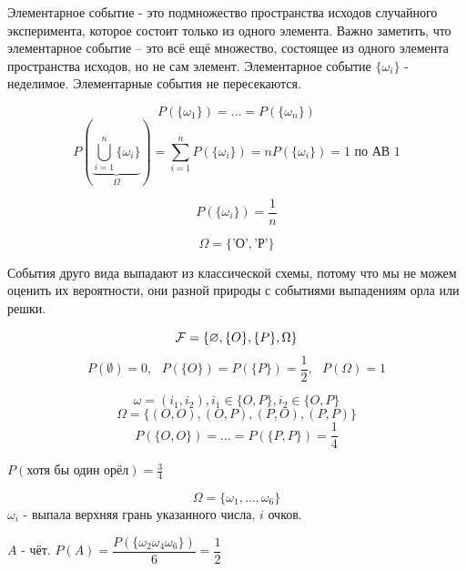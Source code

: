 \begin{definition}
	Элементарное событие - это подмножество пространства исходов случайного эксперимента, которое состоит только из одного элемента. Важно заметить, что элементарное событие – это всё ещё множество, состоящее из одного элемента пространства исходов, но не сам элемент.
	Элементарное событие $\{\omega_i\}$ - неделимое. Элементарные события не пересекаются.
\end{definition}

\begin{definition}[Равновозможность]
	\[ P(\{\omega_1\}) = \dots = P(\{\omega_n\}) \]
	\[ P(\underbrace{\bigcup_{i=1}^{n}\{\omega_i\}}_{\Omega}) = \sum_{i=1}^{n} P(\{\omega_i\}) = n P(\{\omega_i\}) = 1 \text{ по АВ 1} \]
\end{definition}

\[ P(\{\omega_i\}) = \dfrac{1}{n} \]

\begin{exmp}
	\[ \Omega = \{ \text{'О'}, \text{'Р'} \} \]
	
	События друго вида выпадают из классической схемы, потому что мы не можем оценить их вероятности, они разной природы с событиями выпадениям орла или решки.
	
	\[ {\mathcal F} = \{ \varnothing, \{O\}, \{P\}, \Omega \} \]
	\[ P(\emptyset) = 0, ~~~ P(\{O\}) = P(\{P\}) = \frac{1}{2}, ~~~ P(\Omega) = 1 \]
\end{exmp}

\begin{exmp}
	\[ \omega = (i_1, i_2), i_1 \in \{O, P\}, i_2 \in \{O, P\} \]
	\[ \Omega = \{ (O, O), (O, P), (P, O), (P, P) \} \]
	\[ P(\{O, O\}) = \dots = P(\{P, P\}) = \frac{1}{4} \]
	
	$P(\text{хотя бы один орёл}) = \frac{3}{4}$
\end{exmp}

\begin{exmp}[Кубик]
	\[ \Omega = \{ \omega_1, \dots, \omega_6 \} \]
	$\omega_i$ - выпала верхняя грань указанного числа, $i$ очков.
	
	$A$ - чёт. $P(A) = \dfrac{P(\{\omega_2 \omega_4 \omega_6\})}{6} = \dfrac{1}{2}$
\end{exmp}

